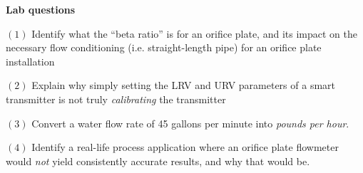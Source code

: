 \noindent
{\bf Lab questions}

\vskip 20pt

\item{$(1)$} Identify what the ``beta ratio'' is for an orifice plate, and its impact on the necessary flow conditioning (i.e. straight-length pipe) for an orifice plate installation

\vskip 20pt

\item{$(2)$} Explain why simply setting the LRV and URV parameters of a smart transmitter is not truly {\it calibrating} the transmitter

\vskip 20pt

\item{$(3)$} Convert a water flow rate of 45 gallons per minute into {\it pounds per hour}.

\vskip 20pt

\item{$(4)$} Identify a real-life process application where an orifice plate flowmeter would {\it not} yield consistently accurate results, and why that would be.
 






